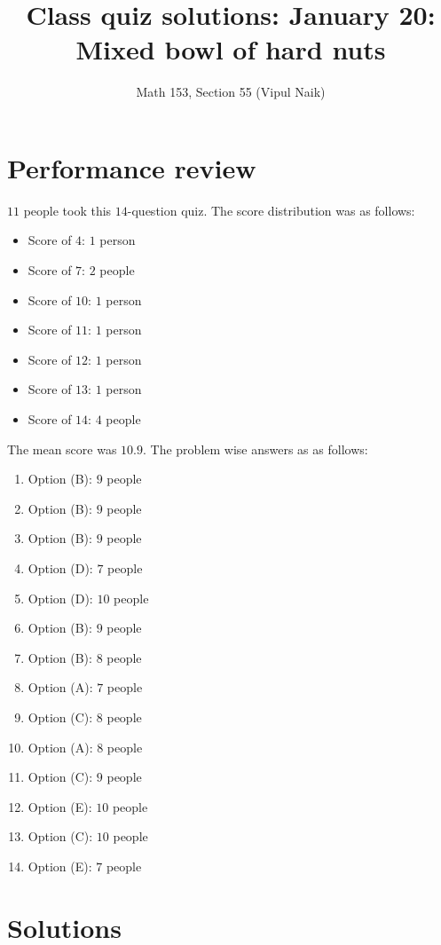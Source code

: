 \documentclass[10pt]{amsart}
\title{Class quiz solutions: January 20: Mixed bowl of hard nuts}
\author{Math 153, Section 55 (Vipul Naik)}
\begin{document}
\maketitle

\section{Performance review}

$11$ people took this $14$-question quiz. The score distribution was
as follows:

\begin{itemize}
\item Score of $4$: $1$ person
\item Score of $7$: $2$ people
\item Score of $10$: $1$ person
\item Score of $11$: $1$ person
\item Score of $12$: $1$ person
\item Score of $13$: $1$ person
\item Score of $14$: $4$ people
\end{itemize}

The mean score was $10.9$. The problem wise answers as as follows:

\begin{enumerate}
\item Option (B): $9$ people
\item Option (B): $9$ people
\item Option (B): $9$ people
\item Option (D): $7$ people
\item Option (D): $10$ people
\item Option (B): $9$ people
\item Option (B): $8$ people
\item Option (A): $7$ people
\item Option (C): $8$ people
\item Option (A): $8$ people
\item Option (C): $9$ people
\item Option (E): $10$ people
\item Option (C): $10$ people
\item Option (E): $7$ people
\end{enumerate}
\section{Solutions}
\end{document}
